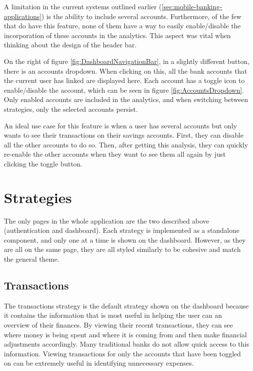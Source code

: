 A limitation in the current systems outlined earlier (\ref{sec:mobile-banking-applications}) is the ability to include several accounts. Furthermore, of the few that do have this feature, none of them have a way to easily enable/disable the incorporation of these accounts in the analytics. This aspect was vital when thinking about the design of the header bar.

On the right of figure \ref{fig:DashboardNavigationBar}, in a slightly different button, there is an accounts dropdown. When clicking on this, all the bank accounts that the current user has linked are displayed here. Each account has a toggle icon to enable/disable the account, which can be seen in figure \ref{fig:AccountsDropdown}. Only enabled accounts are included in the analytics, and when switching between strategies, only the selected accounts persist.

An ideal use case for this feature is when a user has several accounts but only wants to see their transactions on their savings accounts. First, they can disable all the other accounts to do so. Then, after getting this analysis, they can quickly re-enable the other accounts when they want to see them all again by just clicking the toggle button.

\section{Strategies}
The only pages in the whole application are the two described above (authentication and dashboard). Each strategy is implemented as a standalone component, and only one at a time is shown on the dashboard. However, as they are all on the same page, they are all styled similarly to be cohesive and match the general theme.

\subsection{Transactions}
The transactions strategy is the default strategy shown on the dashboard because it contains the information that is most useful in helping the user can an overview of their finances. By viewing their recent transactions, they can see where money is being spent and where it is coming from and then make financial adjustments accordingly. Many traditional banks do not allow quick access to this information. Viewing transactions for only the accounts that have been toggled on can be extremely useful in identifying unnecessary expenses.

